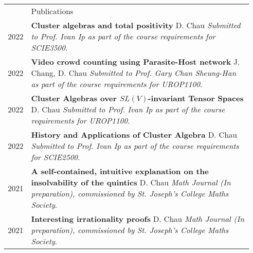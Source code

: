 \documentclass[letterpaper, 11pt]{article}
\newcommand{\headingfont}{\Large\color{OliveGreen}}
\newenvironment{SectionTable}[1]{
	\renewcommand*{\arraystretch}{1.7}
	\setlength{\tabcolsep}{10pt}
	\begin{longtable}{Rp{5.2in}} & #1 \\}
{\end{longtable}\vspace{-.3cm}}
\begin{document}
\begin{SectionTable}{\headingfont Publications}

2022 & 
\textbf{Cluster algebras and total positivity} \newline
D. Chau \newline
\textit{Submitted to Prof. Ivan Ip as part of the course requirements for SCIE3500}. \\

2022 & 
\textbf{Video crowd counting using Parasite-Host network} \newline
J. Chang, D. Chau \newline
\textit{Submitted to Prof. Gary Chan Sheung-Han as part of the course requirements for UROP1100}. \\

2022 & 
\textbf{Cluster Algebras over \(SL(V)\)-invariant Tensor Spaces} \newline
D. Chau \newline
\textit{Submitted to Prof. Ivan Ip as part of the course requirements for UROP1100}. \\

2022 & 
\textbf{History and Applications of Cluster Algebra} \newline
D. Chau \newline
\textit{Submitted to Prof. Ivan Ip as part of the course requirements for SCIE2500}. \\

2021 & 
\textbf{A self-contained, intuitive explanation on the insolvability of the quintics} \newline
D. Chau \newline
\textit{Math Journal (In preparation), commissioned by St. Joseph's College Maths Society}. \\

2021 & 
\textbf{Interesting irrationality proofs} \newline
D. Chau \newline
\textit{Math Journal (In preparation), commissioned by St. Joseph's College Maths Society}. \\
\end{SectionTable}
\end{document}

